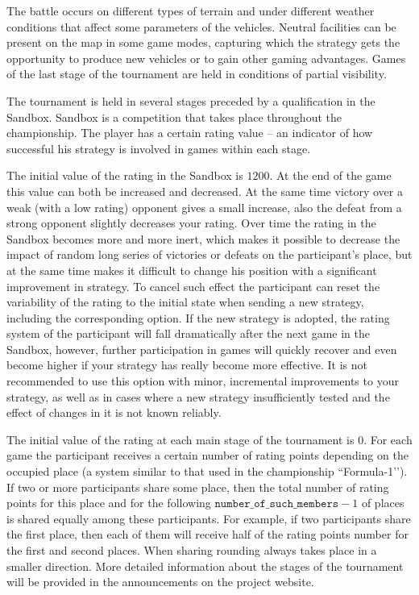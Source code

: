 The battle occurs on different types of terrain and under different weather conditions that affect some parameters of the vehicles. Neutral facilities can be present on the map in some game modes, capturing which the strategy gets the opportunity to produce new
vehicles or to gain other gaming advantages. Games of the last stage of the tournament are held in conditions of partial visibility.

The tournament is held in several stages preceded by a qualification in the Sandbox. Sandbox is a competition that takes place
throughout the championship. The player has a certain rating value -- an indicator of how successful
his strategy is involved in games within each stage.

The initial value of the rating in the Sandbox is $1200$. At the end of the game this value can both be increased and decreased. At the same time victory
over a weak (with a low rating) opponent gives a small increase, also the defeat from a strong opponent slightly decreases your
rating. Over time the rating in the Sandbox becomes more and more inert, which makes it possible to decrease the impact of random long series of victories or
defeats on the participant's place, but at the same time makes it difficult to change his position with a significant improvement in strategy. To cancel such effect
the participant can reset the variability of the rating to the initial state when sending a new strategy, including the corresponding
option. If the new strategy is adopted, the rating system of the participant will fall dramatically after the next game in the Sandbox, however,
further participation in games will quickly recover and even become higher if your strategy has really become more effective. It is not recommended
to use this option with minor, incremental improvements to your strategy, as well as in cases where a new strategy
insufficiently tested and the effect of changes in it is not known reliably.

The initial value of the rating at each main stage of the tournament is $0$. For each game the participant receives a certain number of rating points
depending on the occupied place (a system similar to that used in the championship ``Formula-1’’). If two or more participants share
some place, then the total number of rating points for this place and for the following $\texttt{number\_of\_such\_members}-1$ of places is shared
equally among these participants. For example, if two participants share the first place, then each of them will receive half of the rating points number
for the first and second places. When sharing rounding always takes place in a smaller direction. More detailed information about the stages of the tournament will be
provided in the announcements on the project website.


